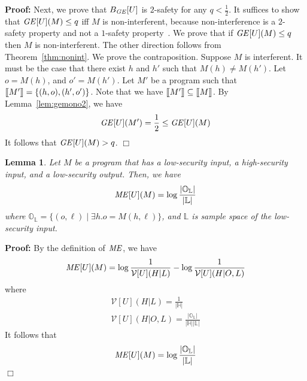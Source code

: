 \documentclass{llncs}
\newtheorem{lemma}[theorem]{Lemma}
\newenvironment{proof}{\noindent\rm{\bf Proof:}}{\hbox{$\Box$}\vspace*{0.2\baselineskip}}
\newcommand{\aset}[1]{\{{#1}\}}
\newcommand{\sembrack}[1]{[\hspace*{-1.2pt}[#1]\hspace*{-1.2pt}]}
\begin{document}
\begin{proof}
Next, we prove that $B_{\it GE}[U]$ is $2$-safety for any
$q<\frac{1}{2}$.  It suffices to show that ${\it GE}[U](M)\le q$ iff
$M$ is non-interferent, because non-interference is a $2$-safety
property and not a $1$-safety
property~\cite{mclean:sp94,barthe:csfw04,darvas:spc05}.  We prove that
if ${\it GE}[U](M)\le q$ then $M$ is non-interferent.  The other
direction follows from Theorem~\ref{thm:nonint}.  We prove the
contraposition.  Suppose $M$ is interferent.  It must be the case that
there exist $h$ and $h'$ such that $M(h)\not=M(h')$.  Let $o=M(h)$,
and $o'=M(h')$.  Let $M'$ be a program such that
$\sembrack{M'}=\aset{(h,o),(h',o')}$.  Note that we have
$\sembrack{M'}\subseteq\sembrack{M}$.  By Lemma~\ref{lem:gemono2}, we
have
\[
{\it GE}[U](M')=\frac{1}{2}\le {\it GE}[U](M)
\]
It follows that ${\it GE}[U](M)>q$.
\end{proof}


\begin{lemma}
\label{lem:mel}
  Let $M$ be a program that has a low-security input, a high-security
  input, and a low-security output.  Then, we have
\[
{\it ME}[U](M)=\log\frac{|{\mathbb O}_{\mathbb L}|}{|{\mathbb L}|}
\]
where ${\mathbb O}_{\mathbb L}=\aset{(o,\ell)\mid \exists h.
  o=M(h,\ell)}$, and ${\mathbb L}$ is sample space of the low-security
input.
\end{lemma}
\begin{proof}
By the definition of ${\it ME}$, we have
\[
{\it ME}[U](M)=\log\frac{1}{\mathcal{V}[U](H|L)}-\log\frac{1}{\mathcal{V}[U](H|O,L)}
\]
where
\[
\begin{array}{c}
  \mathcal{V}[U](H|L)=\frac{1}{|\mathbb{H}|}\\
  \mathcal{V}[U](H|O,L)=\frac{|\mathbb{O}_\mathbb{L}|}{|\mathbb{H}||\mathbb{L}|}
\end{array}
\]
It follows that 
\[
{\it ME}[U](M)=\log\frac{|\mathbb{O}_\mathbb{L}|}{|\mathbb{L}|}
\]
\end{proof}
\end{document}
